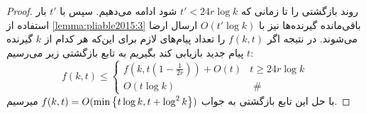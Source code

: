 \begin{proof}
    روند بازگشتی را تا زمانی که
    $t' < 24r \log k$
    شود ادامه می‌دهیم. سپس با
    $t'$
    بار استفاده از
    \autoref{lemma:pliable2015:3}
    باقی‌مانده گیرنده‌ها نیز با
    $O(t' \log k)$
    ارسال ارضا می‌شوند. در نتیجه اگر
    $f(k, t)$
    را تعداد پیام‌های لازم برای این‌که هر کدام از
    $k$
    گیرنده
    $t$
    پیام جدید بازیابی کند بگیریم به تابع بازگشتی زیر می‌رسیم:
    \begin{equation}
        f(k, t) \leq \begin{cases}
                         f\left(k, t\left(1-\frac{1}{2 r}\right)\right)+O(t) & t \geq 24 r \log k \\ O(t \log k) & \text { \# }
        \end{cases}
    \end{equation}
    با حل این تابع بازگشتی به جواب
    $f(k, t) = O(\min\left\{ t \log k, t + \log^2 k \right\})$
    میرسیم.
\end{proof}

